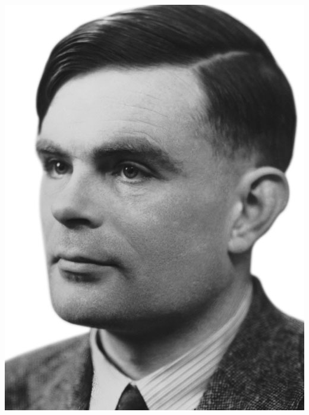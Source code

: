 \documentclass[utf8,10pt]{beamer}
\begin{document}
\begin{frame}
\begin{columns}
    \begin{column}{0.35\textwidth}
        \includegraphics[scale=0.3]{./images/Turing}
    \end{column}
    \end{columns}
    
\end{frame}
\end{document}
